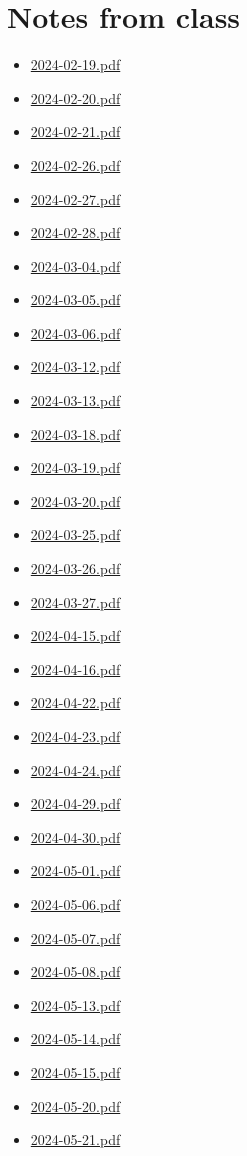 \documentclass[11pt]{article}
\begin{document}
\vfill
\section{Notes from class}
\label{sec:org1276586}
\begin{itemize}
\item \href{notes/2024-02-19.pdf}{2024-02-19.pdf}
\item \href{notes/2024-02-20.pdf}{2024-02-20.pdf}
\item \href{notes/2024-02-21.pdf}{2024-02-21.pdf}
\item \href{notes/2024-02-26.pdf}{2024-02-26.pdf}
\item \href{notes/2024-02-27.pdf}{2024-02-27.pdf}
\item \href{notes/2024-02-28.pdf}{2024-02-28.pdf}
\item \href{notes/2024-03-04.pdf}{2024-03-04.pdf}
\item \href{notes/2024-03-05.pdf}{2024-03-05.pdf}
\item \href{notes/2024-03-06.pdf}{2024-03-06.pdf}
\item \href{notes/2024-03-12.pdf}{2024-03-12.pdf}
\item \href{notes/2024-03-13.pdf}{2024-03-13.pdf}
\item \href{notes/2024-03-18.pdf}{2024-03-18.pdf}
\item \href{notes/2024-03-19.pdf}{2024-03-19.pdf}
\item \href{notes/2024-03-20.pdf}{2024-03-20.pdf}
\item \href{notes/2024-03-25.pdf}{2024-03-25.pdf}
\item \href{notes/2024-03-26.pdf}{2024-03-26.pdf}
\item \href{notes/2024-03-27.pdf}{2024-03-27.pdf}
\item \href{notes/2024-04-15.pdf}{2024-04-15.pdf}
\item \href{notes/2024-04-16.pdf}{2024-04-16.pdf}
\item \href{notes/2024-04-22.pdf}{2024-04-22.pdf}
\item \href{notes/2024-04-23.pdf}{2024-04-23.pdf}
\item \href{notes/2024-04-24.pdf}{2024-04-24.pdf}
\item \href{notes/2024-04-29.pdf}{2024-04-29.pdf}
\item \href{notes/2024-04-30.pdf}{2024-04-30.pdf}
\item \href{notes/2024-05-01.pdf}{2024-05-01.pdf}
\item \href{notes/2024-05-06.pdf}{2024-05-06.pdf}
\item \href{notes/2024-05-07.pdf}{2024-05-07.pdf}
\item \href{notes/2024-05-08.pdf}{2024-05-08.pdf}
\item \href{notes/2024-05-13.pdf}{2024-05-13.pdf}
\item \href{notes/2024-05-14.pdf}{2024-05-14.pdf}
\item \href{notes/2024-05-15.pdf}{2024-05-15.pdf}
\item \href{notes/2024-05-20.pdf}{2024-05-20.pdf}
\item \href{notes/2024-05-21.pdf}{2024-05-21.pdf}
\end{itemize}
\end{document}
